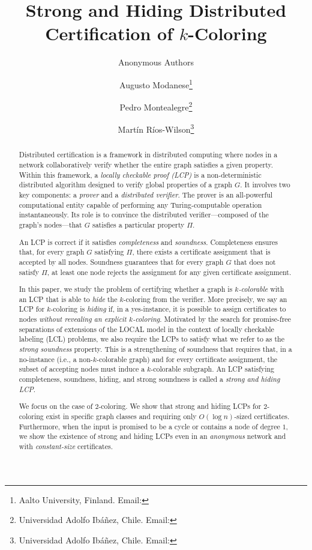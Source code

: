 \documentclass[11pt]{article}
\title{Strong and Hiding Distributed Certification of $k$-Coloring}
\date{}
\author{Anonymous Authors}
\author{Augusto Modanese\thanks{Aalto University, Finland.
    Email: \email{augusto.modanese@aalto.fi}}
  \and Pedro Montealegre\thanks{Universidad Adolfo Ibáñez, Chile.
    Email: \email{p.montealegre@uai.cl}}
  \and Martín Ríos-Wilson\thanks{Universidad Adolfo Ibáñez, Chile.
    Email: \email{martin.rios@uai.cl}}}
\begin{document}
\maketitle
\thispagestyle{empty}

\begin{abstract}
Distributed certification is a framework in distributed computing where nodes in a network collaboratively verify whether the entire graph satisfies a given property. Within this framework, a \emph{locally checkable proof (LCP)} is a non-deterministic distributed algorithm designed to verify global properties of a graph $G$. It involves two key components: a \emph{prover} and a \emph{distributed verifier}. The prover is an all-powerful computational entity capable of performing any Turing-computable operation instantaneously. Its role is to convince the distributed verifier—composed of the graph's nodes—that $G$ satisfies a particular property $\Pi$.  

An LCP is correct if it satisfies \emph{completeness} and \emph{soundness}. Completeness ensures that, for every graph $G$ satisfying $\Pi$, there exists a certificate assignment that is accepted by all nodes. Soundness guarantees that for every graph $G$ that does not satisfy $\Pi$, at least one node rejects the assignment for any given certificate assignment.  

In this paper, we study the problem of certifying whether a graph is
\emph{$k$-colorable} with an LCP that is able to \emph{hide} the $k$-coloring
from the verifier.
More precisely, we say an LCP for $k$-coloring is \emph{hiding} if, in a
yes-instance, it is possible to assign certificates to nodes \emph{without
revealing an explicit $k$-coloring}. 
Motivated by the search for promise-free separations of extensions of the LOCAL
model in the context of locally checkable labeling (LCL) problems, we also
require the LCPs to satisfy what we refer to as the \emph{strong soundness}
property.
This is a strengthening of soundness that requires that, in a no-instance (i.e.,
a non-$k$-colorable graph) and for every certificate assignment, the subset of
accepting nodes must induce a $k$-colorable subgraph.
An LCP satisfying completeness, soundness, hiding, and strong soundness is
called a \emph{strong and hiding LCP}. 

We focus on the case of $2$-coloring.
We show that strong and hiding LCPs for $2$-coloring exist in specific graph
classes and requiring only $O(\log n)$-sized certificates.  
Furthermore, when the input is promised to be a cycle or contains a node of
degree $1$, we show the existence of strong and hiding LCPs even in an 
\emph{anonymous} network and with \emph{constant-size} certificates. 


\end{abstract}
\end{document}
